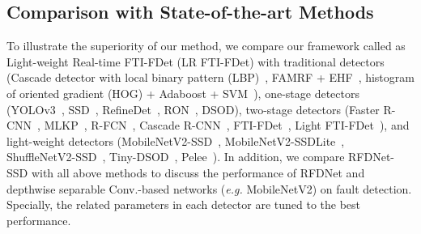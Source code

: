 \subsection{Comparison with State-of-the-art Methods}
To illustrate the superiority of our method, we compare our framework called as Light-weight Real-time FTI-FDet (LR FTI-FDet) with traditional detectors (Cascade detector with local binary pattern (LBP)~\cite{Sun2018Railway}, FAMRF + EHF~\cite{Sun2018Railway}, histogram of oriented gradient (HOG) + Adaboost + SVM~\cite{DollarABP14}), one-stage detectors (YOLOv3~\cite{redmon2018yolov3}, SSD~\cite{LiuAESRFB16}, RefineDet~\cite{zhang2018single}, RON~\cite{kong2017ron}, DSOD), two-stage detectors (Faster R-CNN~\cite{RenHGS15}, MLKP~\cite{wang2018multi}, R-FCN~\cite{DaiLHS16}, Cascade R-CNN~\cite{cai2018cascade}, FTI-FDet~\cite{zhang2018}, Light FTI-FDet~\cite{8911418}), and light-weight detectors (MobileNetV2-SSD~\cite{sandler2018inverted}, MobileNetV2-SSDLite~\cite{sandler2018inverted}, ShuffleNetV2-SSD~\cite{ma2018shufflenet}, Tiny-DSOD~\cite{yuxi2018tinydsod}, Pelee~\cite{wang2018pelee}).  In addition, we compare RFDNet-SSD with all above methods to discuss the performance of RFDNet and depthwise separable Conv.-based networks (\textit{e.g.} MobileNetV2) on fault detection. Specially, the related parameters in each detector are tuned to the best performance. %

